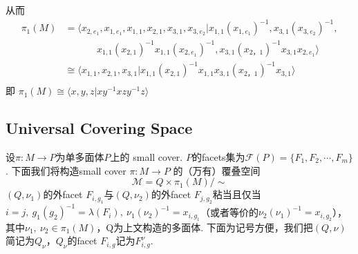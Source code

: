 \documentclass{article}
\theoremstyle{plain}%
\theoremstyle{definition}
\theoremstyle{remark}
\begin{document}
{%

从而
\begin{equation}\label{eq4}
\begin{split}
\pi_1(M)&=\langle x_{2,e_1},x_{1,e_1},x_{1,1},x_{2,1},x_{3,1},x_{3,e_2}|
x_{1,1}(x_{1,e_1})^{-1},x_{3,1}(x_{3,e_2})^{-1},\\&~~~~~~~~~~~~~~~x_{1,1}(x_{2,1})^{-1}x_{1,1}(x_{2,e_1})^{-1}, x_{3,1}(x_{2，1})^{-1}x_{3,1}x_{2,e_1}
\rangle \\
&\cong\langle x_{1,1},x_{2,1},x_{3,1}|x_{1,1}(x_{2,1})^{-1}x_{1,1}x_{3,1}(x_{2，1})^{-1}x_{3,1}
\rangle \\
\end{split}\end{equation}
即
$\pi_1(M)\cong\langle x,y,z|xy^{-1}xzy^{-1}z\rangle$\\}
\subsection{Universal Covering Space}
设$\pi:M\longrightarrow P$为单多面体$P$上的 small cover. $P$的facets集为$\mathcal{F}(P)=\{F_1,F_2,\cdots,F_m\}$.
下面我们将构造small cover $\pi:M\longrightarrow P$
的（万有）覆叠空间
\begin{equation}\label{eq5}
\mathcal{M}=Q\times \pi_1(M)/\sim
\end{equation}
$(Q,\nu_1)$的外facet $F_{i,g_1}$与$(Q,\nu_2)$的外facet $F_{j,g_2}$粘当且仅当$i=j,~g_1(g_2)^{-1}=\lambda(F_i),~\nu_1(\nu_2)^{-1}=x_{i,g_1}$（或者等价的$\nu_2(\nu_1)^{-1}=x_{i,g_2}$），其中$\nu_1,~\nu_2\in \pi_1(M)$，Q为上文构造的多面体. 下面为记号方便，我们把$(Q,\nu)$简记为$Q_{\nu}$，$Q_{\nu}$的facet $F_{i,g}$记为$F_{i,g}^{\nu}$. 
\end{document}
